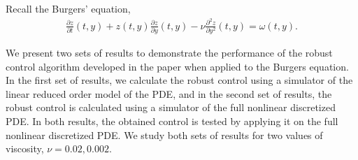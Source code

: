 \documentclass[letterpaper, 10 pt, conference]{ieeeconf}  %
\newcommand{\R}{\mathbb{R}}
\newcommand{\ud}{\mathrm{d}}
\newcommand{\todo}[1]{{\color{blue} #1}}
\begin{document}
Recall the Burgers' equation, 
\begin{align*}
\frac{\partial z}{\partial t}(t,y) + z(t,y) \frac{\partial z}{\partial y}(t,y) - \nu \frac{\partial^2 z}{\partial y^2}(t,y) = \omega(t,y).
\end{align*}



We present two sets of results to demonstrate the performance of the robust control algorithm developed in the paper when applied to the Burgers equation. In the first set of results, we calculate the robust control using a simulator of the linear reduced order model of the PDE, and in the second set of results, the robust control is calculated using a simulator of the full nonlinear discretized PDE. In both results, the obtained control is tested by applying it on the full nonlinear discretized PDE. We study both sets of results for two values of viscosity, $\nu = 0.02,0.002$.
\end{document}
